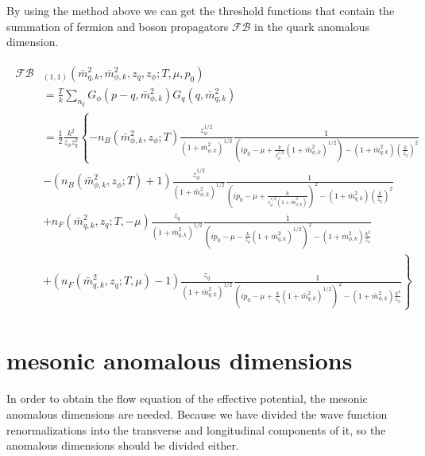 \documentclass[%
reprint,
superscriptaddress,
showpacs,preprintnumbers,
 amsmath,amssymb,
 aps,
prd,
]{revtex4-1}
\begin{document}
By using the method above we can get the threshold functions that contain the summation of fermion and boson 
propagators $\mathcal{FB}$ in the quark anomalous dimension.
\begin{widetext}
\begin{align}
\begin{split}
\mathcal{FB}&_{(1,1)}(\bar{m}^{2}_{q,k},\bar{m}^{2}_{\phi,k},z_q,z_\phi;T,\mu,p_0)\\
&=\frac{T}{k}\sum_{n_q}G_\phi(p-q,\bar{m}^{2}_{\phi,k})G_q(q,\bar{m}^{2}_{q,k})\\
&=\frac{1}{2}\frac{k^2}{z_\phi z^{2}_{q}} \left\{ -n_B(\bar{m}^{2}_{\phi,k},z_\phi;T)
\frac{z^{1/2}_{\phi}}{(1+\bar{m}^{2}_{\phi,k})^{1/2}}\frac{1}{\left( ip_0-\mu+\frac{k}{z^{1/2}_{\phi}}(1+\bar{m}^{2}_{\phi,k})
^{1/2} \right)-(1+\bar{m}^{2}_{q,k})(\frac{k}{z_q})^{2}}\right. \\
&\left.-(n_B(\bar{m}^{2}_{\phi,k},z_\phi;T)+1)\frac{z^{1/2}_{\phi}}{(1+\bar{m}^{2}_{\phi,k})^{1/2}}\frac{1}{\left( ip_0-\mu+
\frac{k}{z^{1/2}_{\phi}(1+\bar{m}^{2}_{\phi,k})} \right)^2-(1+\bar{m}^{2}_{q,k})(\frac{k}{z_q})^{2}}\right. \\
&\left.+n_F(\bar{m}^{2}_{q,k},z_q;T,-\mu)\frac{z_q}{(1+\bar{m}^{2}_{q,k})^{1/2}}\frac{1}{\left( ip_0-\mu-\frac{k}{z_q}(1+
\bar{m}^{2}_{q,k})^{1/2} \right)^2-(1+\bar{m}^{2}_{\phi,k})\frac{k^2}{z_\phi}}\right. \\
&\left.+(n_F(\bar{m}^{2}_{q,k},z_q;T,\mu)-1)\frac{z_q}{(1+\bar{m}^{2}_{q,k})^{1/2}}\frac{1}{\left( ip_0-\mu+\frac{k}{z_q}
(1+\bar{m}^{2}_{q,k})^{1/2} \right)^2-(1+\bar{m}^{2}_{\phi,k})\frac{k^2}{z_\phi}}\right\}
\end{split}
\end{align} 
\end{widetext}



\section{mesonic anomalous dimensions}\label{b}
In order to obtain the flow equation of the effective potential, the mesonic anomalous dimensions are needed. Because 
we have divided the wave function renormalizations into the transverse and longitudinal components of it, so the 
anomalous dimensions should be divided either.




\end{document}
